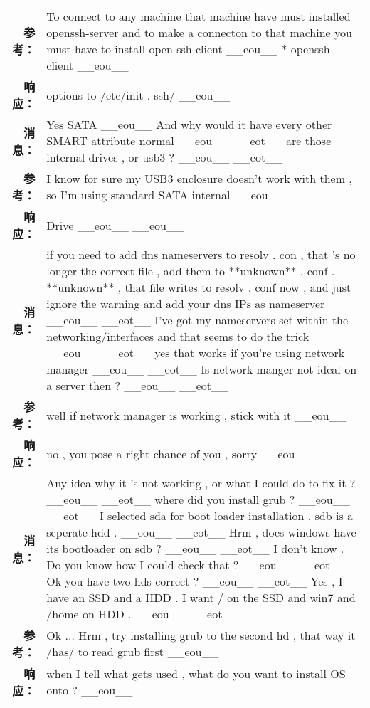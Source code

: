 \begin{tabularx}{0.8\textwidth}{@{}rX@{}}
\textbf{参考：}&To connect to any machine that machine have must installed openssh{-}server and to make a connecton to that machine you must have to install open{-}ssh client \_\_eou\_\_ * openssh{-}client \_\_eou\_\_\\%
\textbf{响应：}&options to /etc/init . ssh/ \_\_eou\_\_\\%
\midrule%
\textbf{消息：}&Yes SATA \_\_eou\_\_ And why would it have every other SMART attribute normal \_\_eou\_\_ \_\_eot\_\_ are those internal drives , or usb3 ? \_\_eou\_\_ \_\_eot\_\_\\%
\textbf{参考：}&I know for sure my USB3 enclosure doesn't work with them , so I'm using standard SATA internal \_\_eou\_\_\\%
\textbf{响应：}&Drive \_\_eou\_\_ \_\_eou\_\_\\%
\midrule%
\textbf{消息：}&if you need to add dns nameservers to resolv . con , that 's no longer the correct file , add them to **unknown** . conf . **unknown** , that file writes to resolv . conf now , and just ignore the warning and add your dns IPs as nameserver \_\_eou\_\_ \_\_eot\_\_ I've got my nameservers set within the networking/interfaces and that seems to do the trick \_\_eou\_\_ \_\_eot\_\_ yes that works if you're using network manager \_\_eou\_\_ \_\_eot\_\_ Is network manger not ideal on a server then ? \_\_eou\_\_ \_\_eot\_\_\\%
\textbf{参考：}&well if network manager is working , stick with it \_\_eou\_\_\\%
\textbf{响应：}&no , you pose a right chance of you , sorry \_\_eou\_\_\\%
\midrule%
\textbf{消息：}&Any idea why it 's not working , or what I could do to fix it ? \_\_eou\_\_ \_\_eot\_\_ where did you install grub ? \_\_eou\_\_ \_\_eot\_\_ I selected sda for boot loader installation . sdb is a seperate hdd . \_\_eou\_\_ \_\_eot\_\_ Hrm , does windows have its bootloader on sdb ? \_\_eou\_\_ \_\_eot\_\_ I don't know . Do you know how I could check that ? \_\_eou\_\_ \_\_eot\_\_ Ok you have two hds correct ? \_\_eou\_\_ \_\_eot\_\_ Yes , I have an SSD and a HDD . I want / on the SSD and win7 and /home on HDD . \_\_eou\_\_ \_\_eot\_\_\\%
\textbf{参考：}&Ok ... Hrm , try installing grub to the second hd , that way it /has/ to read grub first \_\_eou\_\_\\%
\textbf{响应：}&when I tell what gets used , what do you want to install OS onto ? \_\_eou\_\_\\%
\midrule\bottomrule%
%
\end{tabularx}